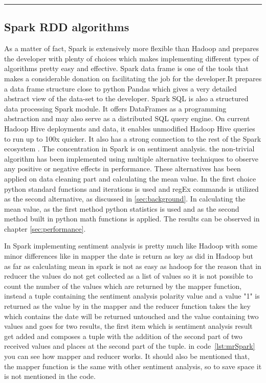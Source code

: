 \rule{200 pt}{0.5 pt}


\subsection{Spark RDD algorithms}
As a matter of fact, Spark is extensively more flexible than Hadoop and prepares the developer with plenty of choices which makes implementing different types of algorithms pretty easy and effective. Spark data frame is one of the tools that makes a considerable donation on facilitating the job for the developer.It prepares a data frame structure close to python Pandas which gives a very detailed abstract view of the data-set to the developer. Spark SQL is also a structured data processing Spark module. It offers DataFrames as a programming abstraction and may also serve as a distributed SQL query engine. On current Hadoop Hive deployments and data, it enables unmodified Hadoop Hive queries to run up to 100x quicker. It also has a strong connection to the rest of the Spark ecosystem \cite{databricks_what_nodate}. 
The concentration in Spark is on sentiment analysis. the non-trivial algorithm has been implemented using multiple alternative techniques to observe any positive or negative effects in performance. These alternatives has been applied on data cleaning part and calculating the mean value. In the first choice python standard functions and iterations is used and regEx commands is utilized as the second alternative, as discussed in \ref{sec:background}. In calculating the mean value, as the first method python statistics is used and as the second method built in python math functions is applied.  The results can be observed in chapter \ref{sec:performance}. 

In Spark implementing sentiment analysis is pretty much like Hadoop with some minor differences like in mapper the date is return as key as did in Hadoop but as far as calculating mean in spark is not as easy as hadoop for the reason that in reducer the values do not get collected as a list of values so it is not possible to count the number of the values which are returned by the mapper function, instead a tuple containing the sentiment analysis polarity value and a value "1" is returned as the value by in the mapper and the reducer function takes the key which contains the date will be returned untouched and the value containing two values and goes for two results, the first item which is sentiment analysis result get added and composes a tuple with the addition of the second part of two received values and  places at the second part of the tuple. in code~\ref{lst:mrSpark} you can see how mapper and reducer works. It should also be mentioned that, the mapper function is the same with other sentiment analysis, so to save space it is not mentioned in the code.


